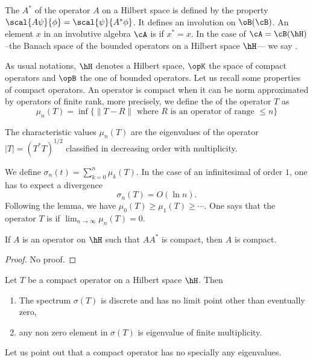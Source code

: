 \begin{definition}
The  $A^*$ of the operator $A$ on a Hilbert space is defined by the property $\scal{A\psi}{\phi}=\scal{\psi}{A^*\phi}$. It defines an involution on $\oB(\cB)$.  An element $x$ in an involutive algebra $\cA$ is  if $x^*=x$. In the case of $\cA=\cB(\hH)$ --the Banach space of the bounded operators on a Hilbert space $\hH$--- we say .
\end{definition}

As usual notations, $\hH$ denotes a Hilbert space, $\opK$ the space of compact operators and $\opB$ the one of bounded operators. Let us recall some properties of compact operators.  An operator is compact when it can be norm approximated by operators of finite rank, more precisely, we define the  of the operator $T$ as
\begin{equation}	\label{Defmuncaharacinfn}
  \mu_n(T)=\inf\{ \| T-R \| \textrm{ where $R$ is an operator of range $\leq n$} \}
\end{equation}

\begin{lemma}
The characteristic values $\mu_n(T)$ are the eigenvalues of the operator $| T |=(T^*T)^{1/2}$ classified in decreasing order with multiplicity.
\end{lemma}



We define $\sigma_n(t)=\sum_{k=0}^n\mu_k(T)$. In the case of an infinitesimal of order $1$, one has to expect a divergence
\[
  \sigma_n(T)=O(\ln n).
\]
Following the lemma, we have $\mu_0(T)\geq\mu_1(T)\geq\cdots$. One says that the operator $T$ is  if $\lim_{n\to\infty}\mu_n(T)=0$.

\begin{lemma}		\label{LemAstAcomAcomp}
	If $A$ is an operator on $\hH$ such that $AA^*$ is compact, then $A$ is compact.
\end{lemma}

\begin{proof}
	No proof.
\end{proof}


\begin{proposition}
Let $T$ be a compact operator on a Hilbert space $\hH$. Then
\begin{enumerate}
\item The spectrum $\sigma(T)$ is discrete and has no limit point other than eventually zero,
\item any non zero element in $\sigma(T)$ is eigenvalue of finite multiplicity.
\end{enumerate}
\end{proposition}
Let us point out that a compact operator has no specially any eigenvalues.

